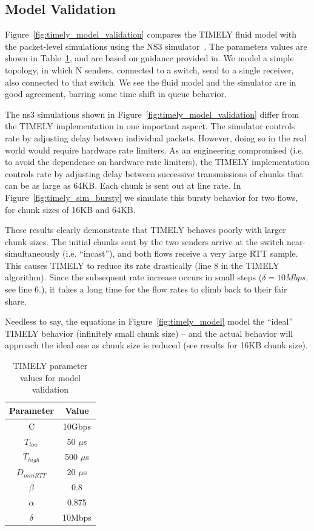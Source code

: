 \subsection{Model Validation}

Figure~\ref{fig:timely_model_validation} compares the TIMELY fluid model with
the packet-level simulations using the NS3 simulator~\cite{ns3}. The parameters
values are shown in Table~\ref{tab:timely_model_validation}, and are based on
guidance provided in\cite{timely}.  We model a simple topology, in which N
senders, connected to a switch, send to a single receiver, also connected to
that switch. We see the fluid model and the simulator are in good agreement,
barring some time shift in queue behavior.

The ns3 simulations shown in Figure~\ref{fig:timely_model_validation} differ
from the TIMELY implementation in one important aspect. The simulator controls
rate by adjusting delay between individual packets. However, doing so in the
real world would require hardware rate limiters. As an engineering compromised
(i.e. to avoid the dependence on hardware rate limiters), the TIMELY
implementation controls rate by adjusting delay between successive transmissions
of chunks that can be as large as 64KB. Each chunk is sent out at line rate.  In
Figure~\ref{fig:timely_sim_bursty} we simulate this bursty behavior for two
flows, for chunk sizes of 16KB and 64KB.

These results clearly demonstrate that TIMELY behaves poorly with larger chunk
sizes. The initial chunks sent by the two senders arrive at the switch
near-simultaneously (i.e. ``incast''), and both flows receive a very large RTT
sample. This causes TIMELY to reduce its rate drastically (line 8 in the TIMELY
algorithm). Since the subsequent rate increase occurs in small steps ($\delta =
10Mbps$, see line 6.), it takes a long time for the flow rates to climb back to
their fair share.

Needless to say, the equations in Figure~\ref{fig:timely_model} model the
``ideal'' TIMELY behavior (infinitely small chunk size) -- and the actual
behavior will approach the ideal one as chunk size is reduced (see results for
16KB chunk size).

\begin{table}[t]
\small
\center
\begin{tabular}{c|c}
Parameter & Value \\ \hline
C & 10Gbps \\ 
$T_{low}$ & 50 $\mu$s \\ 
$T_{high}$ & 500 $\mu$s \\
$D_{minRTT}$ & 20 $\mu$s \\
$\beta$ & 0.8 \\
$\alpha$ & 0.875 \\
$\delta$ & 10Mbps
\end{tabular}
\caption{TIMELY parameter values for model validation}
\label{tab:timely_model_validation}
\end{table}

